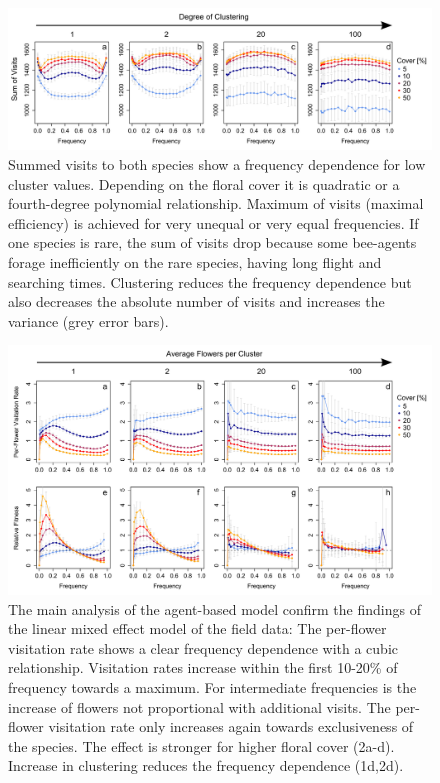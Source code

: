 \begin{figure} [!h]
	\centering
	\includegraphics[width=17cm]{Images/SUM}
	\caption{Summed visits to both species show a frequency dependence for low cluster values. Depending on the floral cover it is quadratic or a fourth-degree polynomial relationship. Maximum of visits (maximal efficiency) is achieved for very unequal or very equal frequencies. If one species is rare, the sum of visits drop because some bee-agents forage inefficiently on the rare species, having long flight and searching times. Clustering reduces the frequency dependence but also decreases the absolute number of visits and increases the variance (grey error bars).}
	\label{fig:SUM}
\end{figure}

\begin{figure} [!ht]
	\centering
	\includegraphics[width=17cm]{Images/PFV}
	\caption{The main analysis of the agent-based model confirm the findings of the linear mixed effect model of the field data: The per-flower visitation rate shows a clear frequency dependence with a cubic relationship. Visitation rates increase within the first 10-20\% of frequency towards a maximum. For intermediate frequencies is the increase of flowers not proportional with additional visits. The per-flower visitation rate only increases again towards exclusiveness of the species. The effect is stronger for higher floral cover (2a-d). Increase in clustering reduces the frequency dependence (1d,2d).}
	\label{fig:PFV}
\end{figure}


